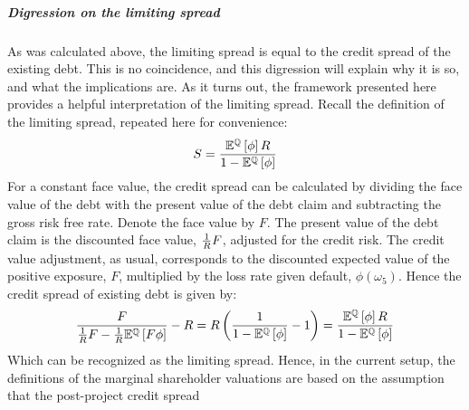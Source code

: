 \documentclass[main.tex]{subfiles}
\begin{document}
    \subparagraph{Digression on the limiting spread}
    As was calculated above, the limiting spread is equal to the credit spread of the existing debt.
    This is no coincidence, and this digression will explain why it is so,
    and what the implications are.
    As it turns out, 
    the framework presented here provides a helpful interpretation of the limiting spread.
    Recall the definition of the limiting spread, repeated here for convenience:
        \begin{equation*}
            S
            =
            \frac{
                \mathbb{E}^{\mathbb{Q}}\left[\phi\right]
                R
            }{
                1
                -
                \mathbb{E}^{\mathbb{Q}}\left[\phi\right]
            }
        \end{equation*}
    For a constant face value,
    the credit spread can be calculated by dividing the face value of the debt
    with the present value of the debt claim and subtracting the gross risk free rate.
    Denote the face value by $F$. 
    The present value of the debt claim is the discounted face value, $\frac{1}{R} F$,
    adjusted for the credit risk. 
    The credit value adjustment, as usual, corresponds to the discounted expected value of
    the positive exposure, $F$, multiplied by the loss rate given default, $\phi(\omega_{5})$.
    Hence the credit spread of existing debt is given by:
        \begin{equation*}
            \frac{
                F
            }{
                \frac{1}{R} F
                -
                \frac{1}{R}
                \mathbb{E}^{\mathbb{Q}}\left[
                    F \phi
                \right] 
            } 
            -
            R
            =
            R \left(
            \frac{
                1
            }{
                    1
                    -
                    \mathbb{E}^{\mathbb{Q}}\left[
                        \phi
                    \right] 
            } 
            - 
            1
            \right)
            =
            \frac{
                \mathbb{E}^{\mathbb{Q}}\left[\phi\right]
                R
            }{
                1
                -
                \mathbb{E}^{\mathbb{Q}}\left[\phi\right]
            }
        \end{equation*}
        Which can be recognized as the limiting spread. 
        Hence, in the current setup, 
        the definitions of the marginal shareholder valuations are based on
        the assumption that the post-project credit spread 
\end{document}
